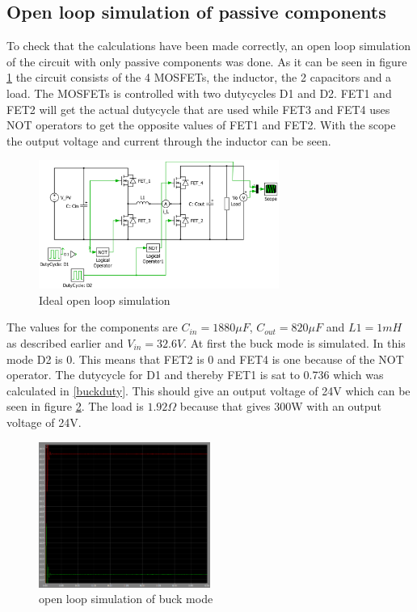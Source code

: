 \subsection{Open loop simulation of passive components}

To check that the calculations have been made correctly, an open loop simulation of the circuit with only passive components was done. As it can be seen in figure \ref{openloop} the circuit consists of the 4 MOSFETs, the inductor, the 2 capacitors and a load. The MOSFETs is controlled with two dutycycles D1 and D2. FET1 and FET2 will get the actual dutycycle that are used while FET3 and FET4 uses NOT operators to get the opposite values of FET1 and FET2. With the scope the output voltage and current through the inductor can be seen.

\begin{figure}[H]
	\begin{center}
		\includegraphics[width=0.7\textwidth]{../Pictures/openloop}
		\caption{Ideal open loop simulation}
		\label{openloop}
	\end{center}
\end{figure}
The values for the components are $C_{in}=1880\mu F$, $C_{out}=820\mu F$ and $L1=1mH$ as described earlier and $V_{in}=32.6V$. At first the buck mode is simulated. In this mode D2 is 0. This means that FET2 is 0 and FET4 is one because of the NOT operator. The dutycycle for D1 and thereby FET1 is sat to 0.736 which was calculated in \ref{buckduty}. This should give an output voltage of 24V which can be seen in figure \ref{bucksimulation}. The load is $1.92\Omega$ because that gives 300W with an output voltage of 24V.     
\begin{figure}[H]
 	\begin{center}
 		\includegraphics[width=0.5\textwidth]{../Pictures/bucksimulation24}
 		\caption{open loop simulation of buck mode}
 		\label{bucksimulation}
 	\end{center}
\end{figure} 
